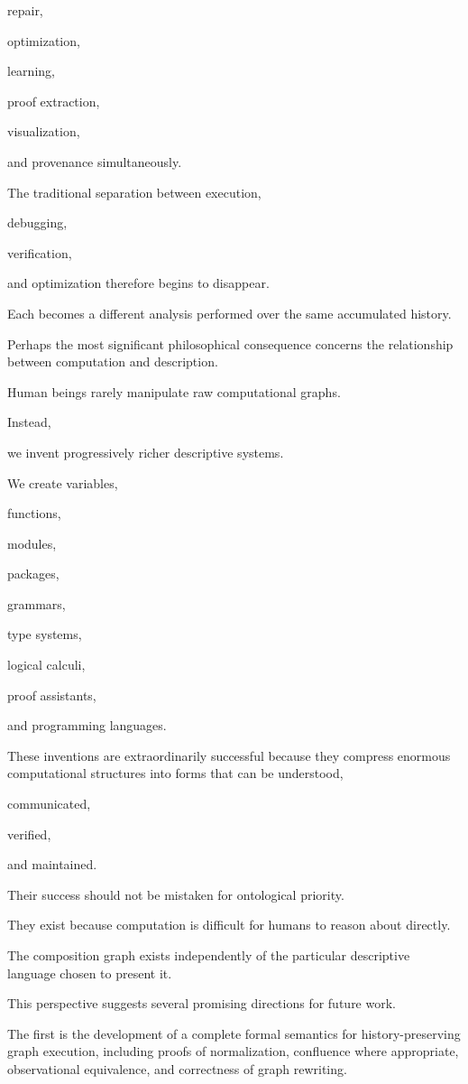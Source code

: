 \documentclass[12pt,oneside]{article}
\begin{document}
repair,

optimization,

learning,

proof extraction,

visualization,

and provenance simultaneously.

The traditional separation between execution,

debugging,

verification,

and optimization therefore begins to disappear.

Each becomes a different analysis performed over the same accumulated history.

Perhaps the most significant philosophical consequence concerns the relationship between computation and description.

Human beings rarely manipulate raw computational graphs.

Instead,

we invent progressively richer descriptive systems.

We create variables,

functions,

modules,

packages,

grammars,

type systems,

logical calculi,

proof assistants,

and programming languages.

These inventions are extraordinarily successful because they compress enormous computational structures into forms that can be understood,

communicated,

verified,

and maintained.

Their success should not be mistaken for ontological priority.

They exist because computation is difficult for humans to reason about directly.

The composition graph exists independently of the particular descriptive language chosen to present it.

This perspective suggests several promising directions for future work.

The first is the development of a complete formal semantics for history-preserving graph execution, including proofs of normalization, confluence where appropriate, observational equivalence, and correctness of graph rewriting.
\end{document}
